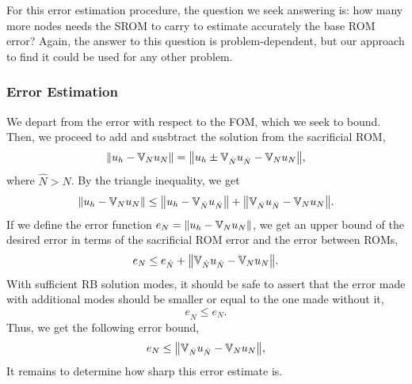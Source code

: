 \documentclass[../../thesis.tex]{subfiles}
\newcommand{\rbV}{\ensuremath{\mathbb{V}}}
\begin{document}
For this error estimation procedure, the question we seek answering is:
how many more nodes needs the SROM to carry to estimate accurately the base ROM error?
Again, the answer to this question is problem-dependent,
but our approach to find it could be used for any other problem.

\subsubsection{Error Estimation}
We depart from the error with respect to the FOM, which we seek to bound.
Then, we proceed to add and susbtract the solution from the sacrificial ROM,
\begin{equation}
    \norm{u_h - \rbV_{N} u_N} = \norm{u_h \pm \rbV_{\hat{N}} u_{\hat{N}} - \rbV_{N} u_{N}},
\end{equation}
where $\hat{N} > N$. 
By the triangle inequality, we get
\begin{equation}
    \norm{u_h - \rbV_{N} u_N} \leq \norm{u_h - \rbV_{\hat{N}} u_{\hat{N}}} + \norm{\rbV_{\hat{N}} u_{\hat{N}} - \rbV_{N} u_{N}}.
\end{equation}
If we define the error function $e_N = \norm{u_h - \rbV_{N} u_N}$, 
we get an upper bound of the desired error in terms of the sacrificial ROM error and the error between ROMs,
\begin{equation}
    e_N \leq e_{\hat{N}} + \norm{\rbV_{\hat{N}} u_{\hat{N}} - \rbV_{N} u_{N}}.
\end{equation}
With sufficient RB solution modes, it should be safe to assert that the error made 
with additional modes should be smaller or equal to the one made without it,
\begin{equation}
    e_{\hat{N}} \leq e_{N}.
\end{equation}
Thus, we get the following error bound,
\begin{equation}
    e_N \leq \norm{\rbV_{\hat{N}} u_{\hat{N}} - \rbV_{N} u_{N}},
\end{equation}
It remains to determine how sharp this error estimate is.
\end{document}
